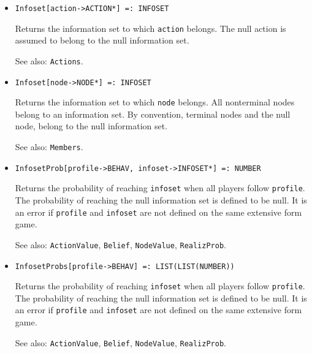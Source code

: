 \begin{itemize}
\item{}
\protect \large \begin{verbatim}
Infoset[action->ACTION*] =: INFOSET 
\end{verbatim} \normalsize

\bd
Returns the information set to which \verb+action+ belongs.  The null
action is assumed to belong to the null information set.
\item [See also:] \verb+Actions+.
\ed

\item{}
\protect \large \begin{verbatim}
Infoset[node->NODE*] =: INFOSET 
\end{verbatim}\normalsize

\bd
Returns the information set to which \verb+node+ belongs.  All
nonterminal nodes belong to an information set.  By convention,
terminal nodes and the null node, belong to the null information set.
\item [See also:] \verb+Members+.
\ed

\item{}
\protect \large \begin{verbatim}
InfosetProb[profile->BEHAV, infoset->INFOSET*] =: NUMBER 
\end{verbatim}\normalsize

\bd
Returns the probability of reaching \verb+infoset+ when all players
follow \verb+profile+.  The probability of reaching the null information
set is defined to be null.  It is an error if \verb+profile+ and
\verb+infoset+ are not defined on the same extensive form game.
\item
[See also:] \verb+ActionValue+, \verb+Belief+, \verb+NodeValue+,
\verb+RealizProb+.
\ed

\item{}
\protect \large \begin{verbatim}
InfosetProbs[profile->BEHAV] =: LIST(LIST(NUMBER)) 
\end{verbatim}\normalsize

\bd
Returns the probability of reaching \verb+infoset+ when all players
follow \verb+profile+.  The probability of reaching the null information
set is defined to be null.  It is an error if \verb+profile+ and
\verb+infoset+ are not defined on the same extensive form game.
\item
[See also:] \verb+ActionValue+, \verb+Belief+, \verb+NodeValue+,
\verb+RealizProb+.
\ed


\end{itemize}
